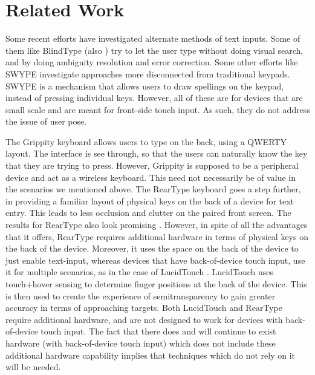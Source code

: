\section{Related Work}

Some recent efforts have investigated alternate methods of text inputs. Some of them like BlindType \cite{BlindType} (also \cite{Brewster}) try to let the user type without doing visual search, and by doing ambiguity resolution and error correction. Some other efforts like SWYPE investigate approaches more disconnected from traditional keypads. SWYPE \cite{Swype} is a mechanism that allows users to draw spellings on the keypad, instead of pressing individual keys. However, all of these are for devices that are small scale and are meant for front-side touch input.  As such, they do not address the issue of user pose.

The Grippity keyboard \cite{Grippity} allows users to type on the back, using a QWERTY layout. The interface is see through, so that the users can naturally know the key that they are trying to press. However, Grippity is supposed to be a peripheral device and act as a wireless keyboard. This need not necessarily be of value in the scenarios we mentioned above. The RearType keyboard goes a step further, in providing a familiar layout of physical keys on the back of a device for text entry. This leads to less occlusion and clutter on the paired front screen. The results for RearType also look promising \cite{RearType}. However, in spite of all the advantages that it offers, RearType requires additional hardware in terms of physical keys on the back of the device. Moreover, it uses the space on the back of the device to just enable text-input, whereas devices that have back-of-device touch input, use it for multiple scenarios, as in the case of LucidTouch \cite{LucidTouch}. LucidTouch uses touch+hover sensing to determine finger positions at the back of the device. This is then used to create the experience of semitransparency to gain greater accuracy in terms of approaching targets. Both LucidTouch and RearType require additional hardware, and are not designed to work for devices with back-of-device touch input. The fact that there does and will continue to exist hardware (with back-of-device touch input) which does not include these additional hardware capability implies that techniques which do not rely on it will be needed.

